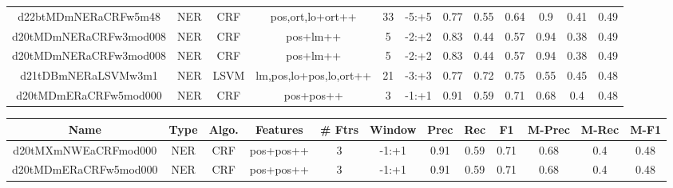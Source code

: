 \documentclass[a4paper]{article}
\begin{document}
\begin{landscape}
\begin{center}
\begin{tabular}{ |c|c|c|c|c|c|c|c|c|c|c|c|}
 	
 
 	
 		
 		\small{ d22btMDmNERaCRFw5m48 } & NER & CRF & pos,ort,lo+ort++  &  33 &  -5:+5  &  0.77 & 0.55 & 0.64  &  0.9 & 0.41 & 0.49 \\
 		

 	
 
 	
 		
 		\small{ d20tMDmNERaCRFw3mod008 } & NER & CRF & pos+lm++  &  5 &  -2:+2  &  0.83 & 0.44 & 0.57  &  0.94 & 0.38 & 0.49 \\
 		

 	
 
 	
 		
 		\small{ d20tMDmNERaCRFw3mod008 } & NER & CRF & pos+lm++  &  5 &  -2:+2  &  0.83 & 0.44 & 0.57  &  0.94 & 0.38 & 0.49 \\
 		

 	
 
 	
 		
 		\small{ d21tDBmNERaLSVMw3m1 } & NER & LSVM & lm,pos,lo+pos,lo,ort++  &  21 &  -3:+3  &  0.77 & 0.72 & 0.75  &  0.55 & 0.45 & 0.48 \\
 		

 	
 
 	
 		
 		\small{ d20tMDmERaCRFw5mod000 } & NER & CRF & pos+pos++  &  3 &  -1:+1  &  0.91 & 0.59 & 0.71  &  0.68 & 0.4 & 0.48 \\
 		
 \hline
\end{tabular}
\end{center}




\begin{center}
\begin{tabular}{ |c|c|c|c|c|c|c|c|c|c|c|c|} 
 \hline
 	Name & Type & Algo. & Features & \# Ftrs & Window & Prec & Rec & F1 & M-Prec & M-Rec & M-F1\\
 \hline

 		

 	
 
 	
 		
 		\small{ d20tMXmNWEaCRFmod000 } & NER & CRF & pos+pos++  &  3 &  -1:+1  &  0.91 & 0.59 & 0.71  &  0.68 & 0.4 & 0.48 \\
 		

 	
 
 	
 		
 		\small{ d20tMDmERaCRFw5mod000 } & NER & CRF & pos+pos++  &  3 &  -1:+1  &  0.91 & 0.59 & 0.71  &  0.68 & 0.4 & 0.48 \\
 		


\end{tabular}
\end{center}
\end{landscape}
\end{document}
